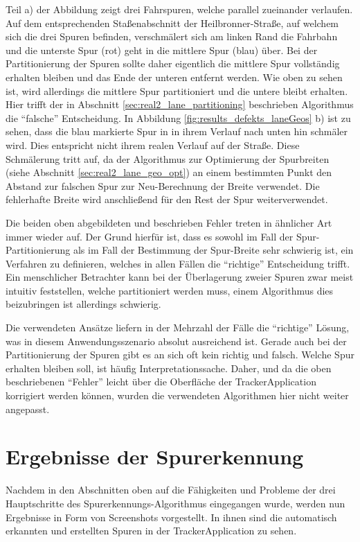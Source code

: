 Teil a) der Abbildung zeigt drei Fahrspuren, welche parallel zueinander verlaufen.
Auf dem entsprechenden Staßenabschnitt der Heilbronner-Straße, auf welchem sich die drei Spuren befinden,
verschmälert sich am linken Rand die Fahrbahn und die unterste Spur (rot) geht in die mittlere Spur (blau) über.
Bei der Partitionierung der Spuren sollte daher eigentlich die mittlere Spur vollständig erhalten bleiben
und das Ende der unteren entfernt werden. Wie oben zu sehen ist, wird allerdings die mittlere Spur partitioniert
und die untere bleibt erhalten. Hier trifft der in Abschnitt \ref{sec:real2_lane_partitioning} beschrieben
Algorithmus die ``falsche'' Entscheidung.
In Abbildung \ref{fig:results_defekts_laneGeos} b) ist zu sehen, dass die blau markierte Spur
in in ihrem Verlauf nach unten hin schmäler wird. Dies entspricht nicht ihrem realen Verlauf auf der Straße.
Diese Schmälerung tritt auf, da der Algorithmus zur Optimierung der Spurbreiten (siehe Abschnitt \ref{sec:real2_lane_geo_opt})
an einem bestimmten Punkt den Abstand zur falschen Spur zur Neu-Berechnung der Breite verwendet.
Die fehlerhafte Breite wird anschließend für den Rest der Spur weiterverwendet.

Die beiden oben abgebildeten und beschrieben Fehler treten in ähnlicher Art immer wieder auf. Der Grund hierfür
ist, dass es sowohl im Fall der Spur-Partitionierung als im Fall der Bestimmung der Spur-Breite sehr schwierig ist,
ein Verfahren zu definieren, welches in allen Fällen die ``richtige'' Entscheidung trifft.
Ein menschlicher Betrachter kann bei der Überlagerung zweier Spuren zwar meist intuitiv feststellen, welche
partitioniert werden muss, einem Algorithmus dies beizubringen ist allerdings schwierig.

Die verwendeten Ansätze liefern in der Mehrzahl der Fälle die ``richtige'' Lösung, was in diesem Anwendungsszenario
absolut ausreichend ist. Gerade auch bei der Partitionierung der Spuren gibt es an sich oft kein richtig und falsch.
Welche Spur erhalten bleiben soll, ist häufig Interpretationssache. Daher, und da die oben beschriebenen ``Fehler''
leicht über die Oberfläche der TrackerApplication korrigiert werden können, wurden die verwendeten
Algorithmen hier nicht weiter angepasst.

\section{Ergebnisse der Spurerkennung}

Nachdem in den Abschnitten oben auf die Fähigkeiten und Probleme der drei Hauptschritte des
Spurerkennungs-Algorithmus eingegangen wurde, werden nun Ergebnisse in Form von Screenshots vorgestellt.
In ihnen sind die automatisch erkannten und erstellten Spuren in der TrackerApplication zu sehen.

